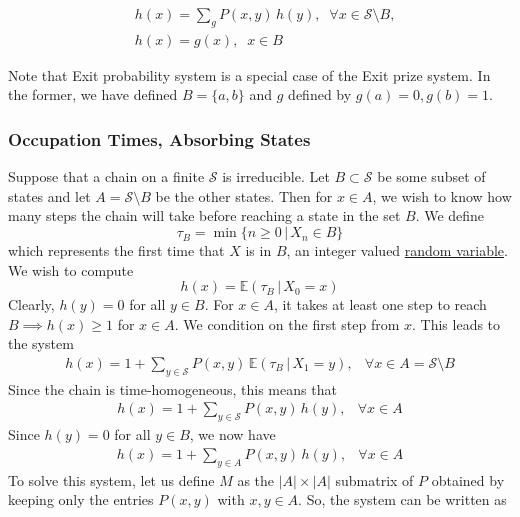     \begin{align*}
      & h(x) = \sum_g P(x, y)\,h(y), \;\; \forall x \in \mathcal{S} \setminus B, \\
      & h(x) = g(x), \;\; x \in B 
    \end{align*}

    Note that Exit probability system is a special case of the Exit prize system. In the former, we have defined $B = \{a, b\}$ and $g$ defined by $g(a) = 0, g(b) = 1$. 

  \subsubsection{Occupation Times, Absorbing States}

    Suppose that a chain on a finite $\mathcal{S}$ is irreducible. Let $B \subset \mathcal{S}$ be some subset of states and let $A = \mathcal{S} \setminus B$ be the other states. Then for $x \in A$, we wish to know how many steps the chain will take before reaching a state in the set $B$. We define 
    \begin{equation}
      \tau_B = \min\{n \geq 0 \,|\, X_n \in B\}
    \end{equation}
    which represents the first time that $X$ is in $B$, an integer valued \hyperref[def:random-variable]{random variable}. We wish to compute
    \begin{equation}
      h(x) = \mathbb{E}(\tau_B \,|\, X_0 = x)
    \end{equation}
    Clearly, $h(y) = 0$ for all $y \in B$. For $x \in A$, it takes at least one step to reach $B \implies h(x) \geq 1$ for $x \in A$. We condition on the first step from $x$. This leads to the system 
    \begin{align*}
      h(x) = 1 + \sum_{y \in \mathcal{S}} P(x, y) \, \mathbb{E}(\tau_B \,|\, X_1 = y), & \forall x \in A = \mathcal{S} \setminus B
    \end{align*}
    Since the chain is time-homogeneous, this means that
    \begin{align*}
      h(x) = 1 + \sum_{y \in \mathcal{S}} P(x, y) \, h(y), & \forall x \in A 
    \end{align*}
    Since $h(y) = 0$ for all $y \in B$, we now have
    \begin{align*}
      h(x) = 1 + \sum_{y \in A} P(x, y) \, h(y), & \forall x \in A 
    \end{align*}
    To solve this system, let us define $M$ as the $|A| \times |A|$ submatrix of $P$ obtained by keeping only the entries $P(x, y)$ with $x, y \in A$. So, the system can be written as
